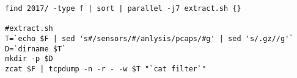 
\begin{lstlisting}
find 2017/ -type f | sort | parallel -j7 extract.sh {}

#extract.sh
T=`echo $F | sed 's#/sensors/#/anlysis/pcaps/#g' | sed 's/.gz//g'`
D=`dirname $T`
mkdir -p $D
zcat $F | tcpdump -n -r - -w $T "`cat filter`"

\end{lstlisting}


